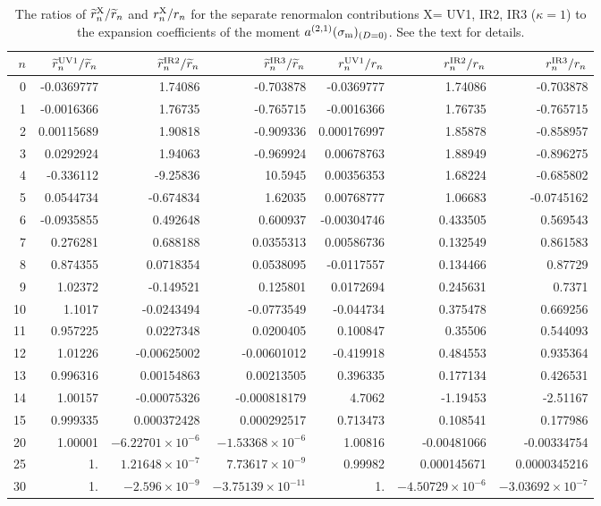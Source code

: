 \documentclass[aps,nofootinbib,showkeys,noshowpacs,preprintnumbers,amsmath,amssymb]{revtex4}
\newcommand{\sm}{{\sigma_{\rm m}}}
\newcommand{\tr}{{\widetilde r}}
\begin{document}
\begin{table}
  \caption{The ratios of $\tr_n^{\rm X}/\tr_n$ and $r_n^{\rm X}/r_n$ for the separate renormalon contributions X= UV1, IR2, IR3 ($\kappa=1$) to the expansion coefficients of the moment $a^{(2,1)}(\sm)_{(D=0)}$. See the text for details.}
\label{tabctrnrn}
\begin{ruledtabular}
\begin{tabular}{r|rrr|rrr}
  $n$ & $\tr_n^{\rm UV1}/\tr_n$ &  $\tr_n^{\rm IR2}/\tr_n$ &  $\tr_n^{\rm IR3}/\tr_n$ &
 $r_n^{\rm UV1}/r_n$ &  $r_n^{\rm IR2}/r_n$ &  $r_n^{\rm IR3}/r_n$   
\\
\hline
0      &  -0.0369777  & 1.74086  & -0.703878  & -0.0369777 & 1.74086 & -0.703878 \\
1       &  -0.0016366 & 1.76735   &  -0.765715  & -0.0016366 & 1.76735 & -0.765715 \\
2       &  0.00115689 & 1.90818 & -0.909336 & 0.000176997 & 1.85878 & -0.858957 \\
3       &  0.0292924 & 1.94063 & -0.969924 & 0.00678763 & 1.88949 & -0.896275 \\
4       & -0.336112 & -9.25836 & 10.5945 & 0.00356353 & 1.68224 & -0.685802 \\
5       &  0.0544734 & -0.674834 & 1.62035 & 0.00768777 & 1.06683 & -0.0745162 \\
6       &  -0.0935855 & 0.492648 & 0.600937 & -0.00304746 & 0.433505 & 0.569543 \\
7       & 0.276281 & 0.688188 & 0.0355313 & 0.00586736 & 0.132549 & 0.861583 \\
8       & 0.874355 & 0.0718354 & 0.0538095 & -0.0117557 & 0.134466 & 0.87729 \\
9       & 1.02372 & -0.149521 & 0.125801 & 0.0172694 & 0.245631 & 0.7371 \\
10      & 1.1017 & -0.0243494 & -0.0773549 & -0.044734 & 0.375478 & 0.669256 \\
11      & 0.957225 & 0.0227348 & 0.0200405 & 0.100847 & 0.35506 & 0.544093 \\
12      & 1.01226 & -0.00625002 & -0.00601012 & -0.419918 & 0.484553 & 0.935364 \\
13      & 0.996316 & 0.00154863 & 0.00213505 & 0.396335 & 0.177134 & 0.426531 \\
14      & 1.00157 & -0.00075326 & -0.000818179 & 4.7062 & -1.19453 & -2.51167 \\
15      & 0.999335 & 0.000372428 & 0.000292517 & 0.713473 & 0.108541 & 0.177986 \\
\hline
20      & 1.00001 & $-6.22701 \times 10^{-6}$ & $-1.53368 \times 10^{-6}$ & 1.00816 & -0.00481066 & -0.00334754 \\
\hline
25      & 1. & $1.21648 \times 10^{-7}$ & $7.73617 \times 10^{-9}$ & 0.99982 & 0.000145671 & 0.0000345216 \\
\hline
30      & 1. & $-2.596 \times 10^{-9}$ & $-3.75139 \times 10^{-11}$ & 1. & $-4.50729 \times 10^{-6}$ & $-3.03692 \times 10^{-7}$
\end{tabular}
\end{ruledtabular}
\end{table}
\end{document}
